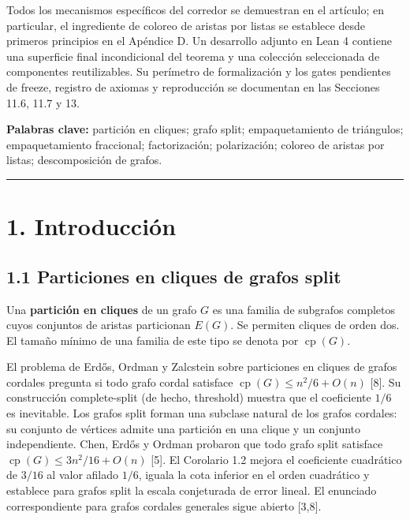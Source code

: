 \documentclass[
  spanish,
  11pt,
  a4paper,
]{article}
\begin{document}
Todos los mecanismos específicos del corredor se demuestran en el artículo; en particular, el ingrediente de coloreo de aristas por listas se establece desde primeros principios en el Apéndice D. Un desarrollo adjunto en Lean 4 contiene una superficie final incondicional del teorema y una colección seleccionada de componentes reutilizables. Su perímetro de formalización y los gates pendientes de freeze, registro de axiomas y reproducción se documentan en las Secciones 11.6, 11.7 y 13.

\textbf{Palabras clave:} partición en cliques; grafo split; empaquetamiento de triángulos; empaquetamiento fraccional; factorización; polarización; coloreo de aristas por listas; descomposición de grafos.

\begin{center}\rule{0.5\linewidth}{0.5pt}\end{center}

\section{1. Introducción}\label{introducciuxf3n}

\subsection{1.1 Particiones en cliques de grafos split}\label{particiones-en-cliques-de-grafos-split}

Una \textbf{partición en cliques} de un grafo \(G\) es una familia de subgrafos completos cuyos conjuntos de aristas particionan \(E(G)\). Se permiten cliques de orden dos. El tamaño mínimo de una familia de este tipo se denota por \(\operatorname{cp}(G)\).

El problema de Erdős, Ordman y Zalcstein sobre particiones en cliques de grafos cordales pregunta si todo grafo cordal satisface \(\operatorname{cp}(G)\le n^2/6+O(n)\) {[}8{]}. Su construcción complete-split (de hecho, threshold) muestra que el coeficiente \(1/6\) es inevitable. Los grafos split forman una subclase natural de los grafos cordales: su conjunto de vértices admite una partición en una clique y un conjunto independiente. Chen, Erdős y Ordman probaron que todo grafo split satisface \(\operatorname{cp}(G)\le 3n^2/16+O(n)\) {[}5{]}. El Corolario 1.2 mejora el coeficiente cuadrático de \(3/16\) al valor afilado \(1/6\), iguala la cota inferior en el orden cuadrático y establece para grafos split la escala conjeturada de error lineal. El enunciado correspondiente para grafos cordales generales sigue abierto {[}3,8{]}.
\end{document}
